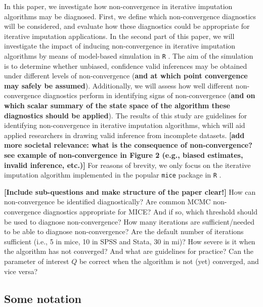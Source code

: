 \documentclass[Royal,times,sageh]{sagej}
\begin{document}
In this paper, we investigate how non-convergence in iterative imputation algorithms may be diagnosed. First, we define which non-convergence diagnostics will be considered, and evaluate how these diagnostics could be appropriate for iterative imputation applications. In the second part of this paper, we will investigate the impact of inducing non-convergence in iterative imputation algorithms by means of model-based simulation in \texttt{R} \citep{R}. The aim of the simulation is to determine whether unbiased, confidence valid inferences may be obtained under different levels of non-convergence (\textbf{and at which point convergence may safely be assumed}). Additionally, we will assess how well different non-convergence diagnostics perform in identifying signs of non-convergence (\textbf{and on which scalar summary of the state space of the algorithm these diagnostics should be applied}). The results of this study are guidelines for identifying non-convergence in iterative imputation algorithms, which will aid applied researchers in drawing valid inference from incomplete datasets. \textbf{{[}add more societal relevance: what is the consequence of non-convergence? see example of non-convergence in Figure 2 (e.g., biased estimates, invalid inference, etc.){]}} For reasons of brevity, we only focus on the iterative imputation algorithm implemented in the popular \texttt{mice} package \citep{mice} in \texttt{R} \citep{R}.

\textbf{{[}Include sub-questions and make structure of the paper clear!{]}} How can non-convergence be identified diagnostically? Are common MCMC non-convergence diagnostics appropriate for MICE? And if so, which threshold should be used to diagnose non-convergence? How many iterations are sufficient/needed to be able to diagnose non-convergence? Are the default number of iterations sufficient (i.e., 5 in mice, 10 in SPSS and Stata, 30 in mi)? How severe is it when the algorithm has not converged? And what are guidelines for practice? Can the parameter of interest \(Q\) be correct when the algorithm is not (yet) converged, and vice versa?

\hypertarget{some-notation}{%
\subsection{Some notation}\label{some-notation}}
\end{document}
